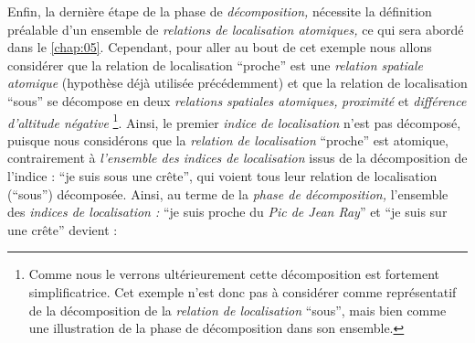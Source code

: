 Enfin, la dernière étape de la phase de \emph{décomposition,}
nécessite la définition préalable d'un ensemble de \emph{relations de
  localisation atomiques,} ce qui sera abordé dans le
\autoref{chap:05}. Cependant, pour aller au bout de cet exemple nous
allons considérer que la relation de localisation \enquote{proche} est
une \emph{relation spatiale atomique} (hypothèse déjà utilisée
précédemment) et que la relation de localisation \enquote{sous} se
décompose en deux \emph{relations spatiales atomiques,}
\emph{proximité} et \emph{différence d'altitude négative}
\footnote{Comme nous le verrons ultérieurement cette décomposition est
  fortement simplificatrice. Cet exemple n'est donc pas à considérer
  comme représentatif de la décomposition de la \emph{relation de
    localisation} \enquote{sous}, mais bien comme une illustration de
  la phase de décomposition dans son ensemble.}. Ainsi, le premier
\emph{indice de localisation} n'est pas décomposé, puisque nous
considérons que la \emph{relation de localisation} \enquote{proche}
est atomique, contrairement à \emph{l'ensemble des indices de
  localisation} issus de la décomposition de l'indice : \enquote{je
  suis sous une crête}, qui voient tous leur relation de localisation
(\enquote{sous}) décomposée. Ainsi, au terme de la \emph{phase de
  décomposition,} l'ensemble des \emph{indices de localisation :}
\enquote{je suis proche du \emph{Pic de Jean Ray}} et \enquote{je suis
  sur une crête} devient :

